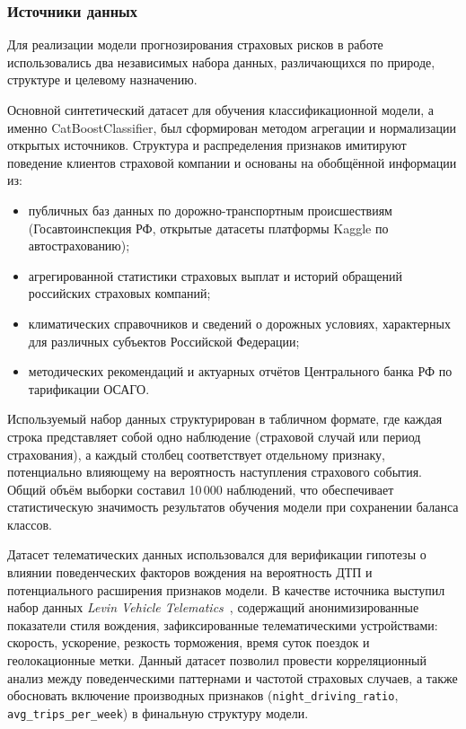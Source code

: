 \subsubsection{Источники данных}

Для реализации модели прогнозирования страховых рисков в работе использовались два независимых набора данных, различающихся по природе, структуре и целевому назначению.

Основной синтетический датасет для обучения классификационной модели, а именно CatBoostClassifier, был сформирован методом агрегации и нормализации открытых источников. Структура и распределения признаков имитируют поведение клиентов страховой компании и основаны на обобщённой информации из:
\begin{itemize}
    \item публичных баз данных по дорожно-транспортным происшествиям (Госавтоинспекция РФ, открытые датасеты платформы Kaggle по автострахованию);
    \item агрегированной статистики страховых выплат и историй обращений российских страховых компаний;
    \item климатических справочников и сведений о дорожных условиях, характерных для различных субъектов Российской Федерации;
    \item методических рекомендаций и актуарных отчётов Центрального банка РФ по тарификации ОСАГО.
\end{itemize}

Используемый набор данных структурирован в табличном формате, где каждая строка представляет собой одно наблюдение (страховой случай или период страхования), а каждый столбец соответствует отдельному признаку, потенциально влияющему на вероятность наступления страхового события. Общий объём выборки составил 10\,000 наблюдений, что обеспечивает статистическую значимость результатов обучения модели при сохранении баланса классов.

Датасет телематических данных использовался для верификации гипотезы о влиянии поведенческих факторов вождения на вероятность ДТП и потенциального расширения признаков модели. В качестве источника выступил набор данных \textit{Levin Vehicle Telematics}~\cite{levin2026telematics}, содержащий анонимизированные показатели стиля вождения, зафиксированные телематическими устройствами: скорость, ускорение, резкость торможения, время суток поездок и геолокационные метки. Данный датасет позволил провести корреляционный анализ между поведенческими паттернами и частотой страховых случаев, а также обосновать включение производных признаков (\texttt{night\_driving\_ratio}, \texttt{avg\_trips\_per\_week}) в финальную структуру модели.

